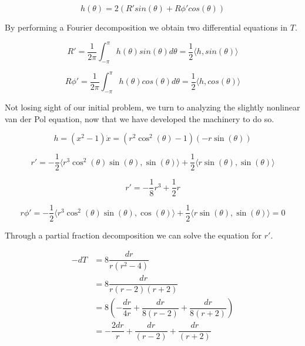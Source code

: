 \documentclass[12pt]{article}
\begin{document}
\begin{equation}
h(\theta) = 2(R'sin(\theta) + R \phi' cos(\theta))
\end{equation}

By performing a Fourier decomposition we obtain two differential equations in $T$.

\begin{equation}
R' = \dfrac{1}{2 \pi} \int_{-\pi}^{\pi} h(\theta) sin(\theta) d \theta = \dfrac{1}{2} \langle h, sin(\theta) \rangle
\end{equation}

\begin{equation}
R \phi' = \dfrac{1}{2 \pi} \int_{-\pi}^{\pi} h(\theta) cos(\theta) d \theta  = \dfrac{1}{2}\langle h, cos(\theta) \rangle
\end{equation}

Not losing sight of our initial problem, we turn to analyzing the slightly nonlinear van der Pol equation, now that we have developed the machinery to do so.

\begin{equation}
h = (x^2 - 1) \dot{x} = (r^2 \cos^2(\theta) -1)(-r \sin(\theta)) 
\end{equation}

\begin{equation}
r' = - \dfrac{1}{2} \langle r^3 \cos^2(\theta) \sin(\theta), \sin(\theta) \rangle +  \dfrac{1}{2} \langle r \sin(\theta), \sin(\theta) \rangle
\end{equation}

\begin{equation}
r' = -\dfrac{1}{8} r^3 + \dfrac{1}{2}r
\end{equation}

\begin{equation}
r \phi' = - \dfrac{1}{2} \langle r^3 \cos^2(\theta) \sin(\theta), \cos(\theta) \rangle +  \dfrac{1}{2} \langle r \sin(\theta), \sin(\theta) \rangle = 0
\end{equation}

Through a partial fraction decomposition we can solve the equation for $r'$.

\begin{equation}
\begin{split}
 -dT & = 8 \dfrac{dr}{r(r^2-4)} \\
 & = 8 \dfrac{dr}{r(r-2)(r+2)} \\
 & = 8( -\dfrac{dr}{4r}  + \dfrac{dr}{8(r-2)}+\dfrac{dr}{8(r+2)}) \\
 & = -\dfrac{2dr}{r}  + \dfrac{dr}{(r-2)}+\dfrac{dr}{(r+2)}
\end{split}
\end{equation}
\end{document}
